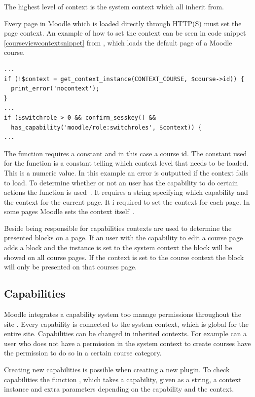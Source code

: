 The highest level of context is the system context which all inherit from. 

Every page in Moodle which is loaded directly through HTTP(S) must set the page context. 
An example of how to set the context can be seen in code snippet \ref{courseviewcontextsnippet} from , which loads the default page of a Moodle course.

\begin{lstlisting}[style=phpCode, caption=\myCaption{A snippet from \moodlefile{/course/view.php}}, label=courseviewcontextsnippet]
...
if (!$context = get_context_instance(CONTEXT_COURSE, $course->id)) {
  print_error('nocontext');
}
...
if ($switchrole > 0 && confirm_sesskey() &&
  has_capability('moodle/role:switchroles', $context)) {
...	
\end{lstlisting}
The function  requires a constant and in this case a course id. 
The constant used for the function is a constant telling which context level that needs to be loaded. 
This is a numeric value. 
In this example an error is outputted if the context fails to load. 
To determine whether or not an user has the capability to do certain actions the function  is used~\cite{moodlerolesandmodules}. It requires a string specifying which capability and the context for the current page. 
It i required to set the context for each page. 
In some pages Moodle sets the context itself~\cite{moodlepageapi}. 

Beside being responsible for capabilities contexts are used to determine the presented blocks on a page. If an user with the capability to edit a course page adds a block and the instance is set to the system context the block will be showed on all course pages. If the context is set to the course context the block will only be presented on that courses page. 

	
\subsection{Capabilities}
\label{sub:capabilities}
Moodle integrates a capability system too manage permissions throughout the site \cite{moodlerolesandmodules}. 
Every capability is connected to the system context, which is global for the entire site. 
Capabilities can be changed in inherited contexts. 
For example can a user who does not have a permission in the system context to create courses have the permission to do so in a certain course category. 

Creating new capabilities is possible when creating a new plugin. 
To check capabilities the function , which takes a capability, given as a string, a context instance and extra parameters depending on the capability and the context. 


	